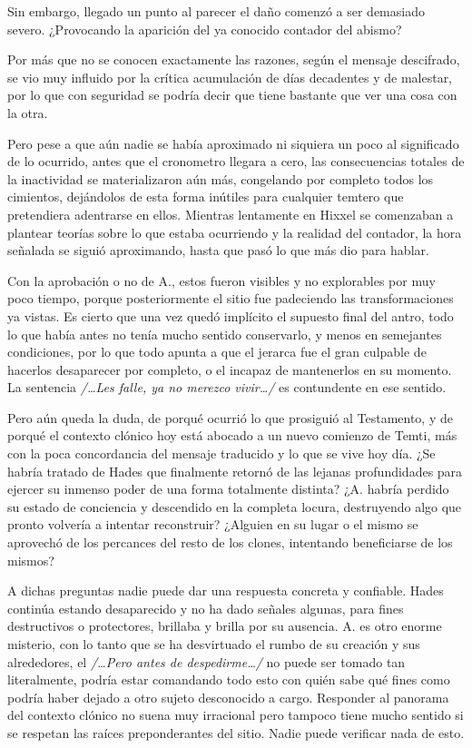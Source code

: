 \documentclass[
  spanish,
]{book}
\begin{document}
Sin embargo, llegado un punto al parecer el daño comenzó a ser demasiado severo. ¿Provocando la aparición del ya conocido contador del abismo?

Por más que no se conocen exactamente las razones, según el mensaje descifrado, se vio muy influido por la crítica acumulación de días decadentes y de malestar, por lo que con seguridad se podría decir que tiene bastante que ver una cosa con la otra.

Pero pese a que aún nadie se había aproximado ni siquiera un poco al significado de lo ocurrido, antes que el cronometro llegara a cero, las consecuencias totales de la inactividad se materializaron aún más, congelando por completo todos los cimientos, dejándolos de esta forma inútiles para cualquier temtero que pretendiera adentrarse en ellos. Mientras lentamente en Hixxel se comenzaban a plantear teorías sobre lo que estaba ocurriendo y la realidad del contador, la hora señalada se siguió aproximando, hasta que pasó lo que más dio para hablar.

Con la aprobación o no de A., estos fueron visibles y no explorables por muy poco tiempo, porque posteriormente el sitio fue padeciendo las transformaciones ya vistas. Es cierto que una vez quedó implícito el supuesto final del antro, todo lo que había antes no tenía mucho sentido conservarlo, y menos en semejantes condiciones, por lo que todo apunta a que el jerarca fue el gran culpable de hacerlos desaparecer por completo, o el incapaz de mantenerlos en su momento. La sentencia \emph{/\ldots Les falle, ya no merezco vivir\ldots/} es contundente en ese sentido.

Pero aún queda la duda, de porqué ocurrió lo que prosiguió al Testamento, y de porqué el contexto clónico hoy está abocado a un nuevo comienzo de Temti, más con la poca concordancia del mensaje traducido y lo que se vive hoy día. ¿Se habría tratado de Hades que finalmente retornó de las lejanas profundidades para ejercer su inmenso poder de una forma totalmente distinta? ¿A. habría perdido su estado de conciencia y descendido en la completa locura, destruyendo algo que pronto volvería a intentar reconstruir? ¿Alguien en su lugar o el mismo se aprovechó de los percances del resto de los clones, intentando beneficiarse de los mismos?

A dichas preguntas nadie puede dar una respuesta concreta y confiable. Hades continúa estando desaparecido y no ha dado señales algunas, para fines destructivos o protectores, brillaba y brilla por su ausencia. A. es otro enorme misterio, con lo tanto que se ha desvirtuado el rumbo de su creación y sus alrededores, el \emph{/\ldots Pero antes de despedirme\ldots/} no puede ser tomado tan literalmente, podría estar comandando todo esto con quién sabe qué fines como podría haber dejado a otro sujeto desconocido a cargo. Responder al panorama del contexto clónico no suena muy irracional pero tampoco tiene mucho sentido si se respetan las raíces preponderantes del sitio. Nadie puede verificar nada de esto.
\end{document}
